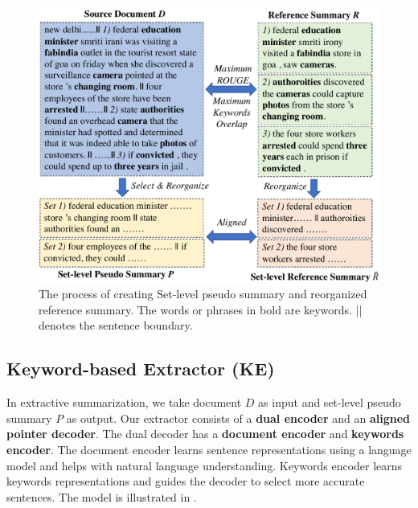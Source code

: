 \begin{figure}[th]
	\centering
	\includegraphics[width=1.0\linewidth]{pseudo.pdf}
	\caption{The process of creating Set-level pseudo summary and 
reorganized reference summary. 
The words or phrases in bold are keywords. || denotes the sentence boundary.}
	\label{fig:heuristics}
\end{figure}



\subsection{Keyword-based Extractor (KE)}
\label{sec:ke}
In extractive summarization, we take document $D$ as input and set-level pseudo summary $P$ as output.
Our extractor consists of a \textbf{dual encoder} and an \textbf{aligned pointer decoder}.
The dual decoder has a \textbf{document encoder} and \textbf{keywords encoder}.
The document encoder learns sentence representations using a language model
and helps with natural language understanding.
Keywords encoder learns keywords representations
and guides the decoder to select more accurate sentences.
The model is illustrated in .

